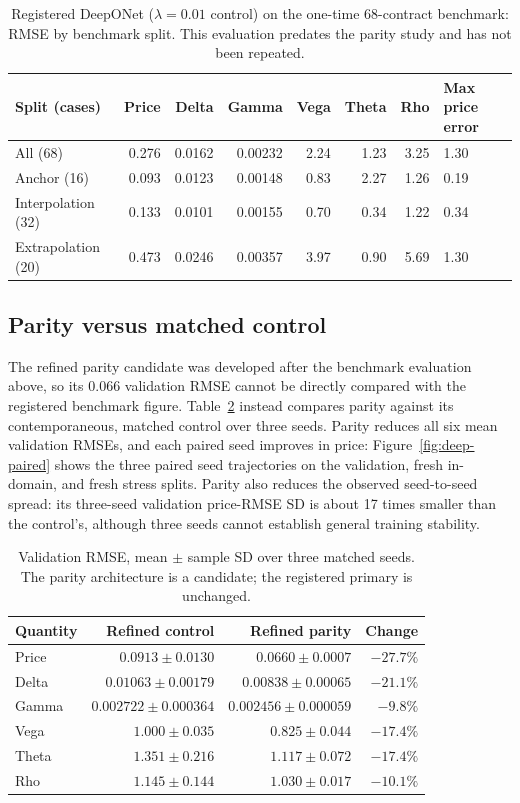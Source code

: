 \documentclass[11pt,a4paper]{article}
\begin{document}
\begin{table}[!ht]\centering\small
\caption{Registered DeepONet ($\lambda=0.01$ control) on the one-time 68-contract benchmark: RMSE by benchmark split. This evaluation predates the parity study and has not been repeated.}
\label{tab:deep-benchmark}
\begin{tabular}{lrrrrrrl}\toprule
Split (cases) & Price & Delta & Gamma & Vega & Theta & Rho & Max price error\\\midrule
All (68) & 0.276 & 0.0162 & 0.00232 & 2.24 & 1.23 & 3.25 & 1.30\\
Anchor (16) & 0.093 & 0.0123 & 0.00148 & 0.83 & 2.27 & 1.26 & 0.19\\
Interpolation (32) & 0.133 & 0.0101 & 0.00155 & 0.70 & 0.34 & 1.22 & 0.34\\
Extrapolation (20) & 0.473 & 0.0246 & 0.00357 & 3.97 & 0.90 & 5.69 & 1.30\\\bottomrule
\end{tabular}\end{table}

\subsection{Parity versus matched control}
\label{sec:res-parity}
The refined parity candidate was developed after the benchmark evaluation above, so its 0.066 validation RMSE cannot be directly compared with the registered benchmark figure. Table~\ref{tab:deep} instead compares parity against its contemporaneous, matched control over three seeds. Parity reduces all six mean validation RMSEs, and each paired seed improves in price: Figure~\ref{fig:deep-paired} shows the three paired seed trajectories on the validation, fresh in-domain, and fresh stress splits. Parity also reduces the observed seed-to-seed spread: its three-seed validation price-RMSE SD is about 17 times smaller than the control's, although three seeds cannot establish general training stability.

\begin{table}[!ht]\centering\small
\caption{Validation RMSE, mean $\pm$ sample SD over three matched seeds. The parity architecture is a candidate; the registered primary is unchanged.}
\label{tab:deep}
\begin{tabular}{lrrr}\toprule
Quantity & Refined control & Refined parity & Change\\\midrule
Price & $0.0913\pm0.0130$ & $0.0660\pm0.0007$ & $-27.7\%$\\
Delta & $0.01063\pm0.00179$ & $0.00838\pm0.00065$ & $-21.1\%$\\
Gamma & $0.002722\pm0.000364$ & $0.002456\pm0.000059$ & $-9.8\%$\\
Vega & $1.000\pm0.035$ & $0.825\pm0.044$ & $-17.4\%$\\
Theta & $1.351\pm0.216$ & $1.117\pm0.072$ & $-17.4\%$\\
Rho & $1.145\pm0.144$ & $1.030\pm0.017$ & $-10.1\%$\\\bottomrule
\end{tabular}\end{table}
\end{document}
